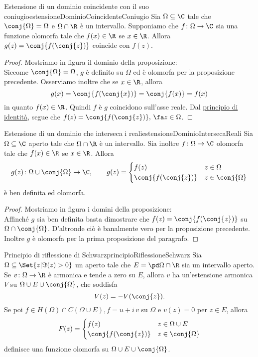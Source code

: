 \begin{prop}{Estensione di un dominio coincidente con il suo coniugio}{estensioneDominioCoincidenteConiugio}
	Sia \(\Omega\subseteq \C\) tale che \(\conj{\Omega}=\Omega\) e \(\Omega\cap\R\) è un intervallo.
	Supponiamo che \(f\colon \Omega \to \C\) sia una funzione olomorfa tale che \(f(x)\in\R\) se \(x\in\R\). Allora \(g(z)=\conj{f(\conj{z})}\) coincide con \(f(z)\).
\end{prop}

\begin{proof}
	Mostriamo in figura il dominio della proposizione:
	\[
		
	\]
	Siccome \(\conj{\Omega}=\Omega\), \(g\) è definito su \(\Omega\) ed è olomorfa per la proposizione precedente.
	Osserviamo inoltre che se \(x\in\R\), allora
	\[
		g(x) = \conj{f(\conj{x})} = \conj{f(x)} = f(x)
	\]
	in quanto \(f(x)\in\R\). Quindi \(f\) è \(g\) coincidono sull'asse reale.
	Dal \hyperref[th:principioIdentità]{principio di identità}, segue che \(f(z)=\conj{f(\conj{z})},\,\fa z\in\Omega\).
\end{proof}

\begin{prop}{Estensione di un dominio che interseca i reali}{estensioneDominioIntersecaReali}
	Sia \(\Omega\subseteq\C\) aperto tale che \(\Omega \cap \R\) è un intervallo.
	Sia inoltre \(f\colon \Omega \to \C\) olomorfa tale che \(f(x)\in\R\) se \(x\in\R\). Allora
	\[
		g(z) \colon \Omega \cup \conj{\Omega} \to \C, \qquad g(z) = \begin{cases}
			f(z)               & z\in\Omega        \\
			\conj{f(\conj{z})} & z\in\conj{\Omega}
		\end{cases}
	\]
	è ben definita ed olomorfa.
\end{prop}

\begin{proof}
	Mostriamo in figura i domini della proposizione:
	\[
		
	\]
	Affinché \(g\) sia ben definita basta dimostrare che \(f(z)=\conj{f(\conj{z})}\) su \(\Omega\cap\conj{\Omega}\). D'altronde ciò è banalmente vero per la proposizione precedente. Inoltre \(g\) è olomorfa per la prima proposizione del paragrafo.
\end{proof}

\begin{teor}{Principio di riflessione di Schwarz}{principioRiflessioneSchwarz}
	Sia \(\Omega\subseteq\Set{z | \Im(z)>0}\) un aperto tale che \(E=\pd \Omega \cap \R\) sia un intervallo aperto.
	Se \(v\colon \Omega \to \R\) è armonica e tende a zero su \(E\), allora \(v\) ha un'estensione armonica \(V\) su \(\Omega \cup E \cup \conj{\Omega}\), che soddisfa
	\[
		V(z) = -V(\conj{z}).
	\]
	Se poi \(f\in H(\Omega)\cap C(\Omega\cup E), f=u+i\,v\) su \(\Omega\) e \(v(z)=0\) per \(z\in E\), allora
	\[
		F(z) = 	\begin{cases}
			f(z)               & z\in\Omega\cup E  \\
			\conj{f(\conj{z})} & z\in\conj{\Omega}
		\end{cases}
	\]
	definisce una funzione olomorfa su \(\Omega\cup E\cup \conj{\Omega}\).
\end{teor}

